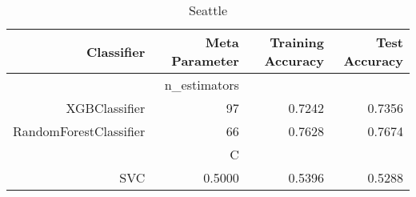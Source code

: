 
\begin{table}[H]
    \caption{Seattle}
    \centering
    \begin{tabular}{|r|r|r|r|}
        \hline
        Classifier &Meta Parameter &Training Accuracy
        &Test Accuracy\\
        \hline
        &n\_estimators &\multicolumn{2}{|r|}{}\\
        \hline
        XGBClassifier &97 &0.7242 &0.7356\\
        \hline
        RandomForestClassifier &66 &0.7628 &0.7674\\
        \hline
        &C &\multicolumn{2}{|r|}{}\\
        \hline
        SVC &0.5000 &0.5396 &0.5288\\
        \hline
    \end{tabular}
\end{table}
